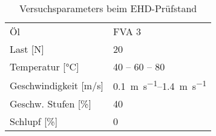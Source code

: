 \begin{table}[htbp]
    \centering
    \caption{Versuchsparameters beim EHD-Prüfstand}
    \begin{tabular}{ll}
        Öl                                                        & FVA 3                                                  \\
        Last [\si{N}]                                             & 20                                                     \\
        Temperatur [\si{\degreeCelsius}]                          & 40 – 60 – 80                                           \\
        Geschwindigkeit [\si[per-mode=symbol]{\meter\per\second}] & \SIrange[per-mode=symbol]{0.1}{1.4}{\meter\per\second} \\
        Geschw. Stufen [\si{\%}]                                  & 40                                                     \\
        Schlupf [\si{\%}]                                         & 0                                                      \\
    \end{tabular}
    \label{tab:ehd_test_params}
\end{table}
